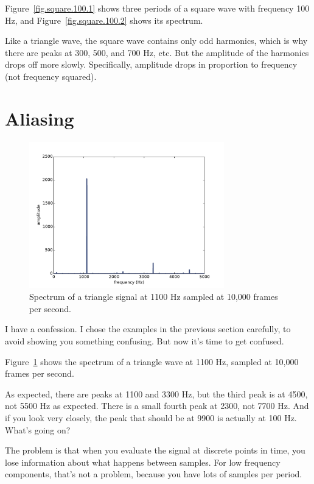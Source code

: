 \documentclass[12pt]{book}
\begin{document}
Figure~\ref{fig.square.100.1} shows three periods of a square
wave with frequency 100 Hz,
and Figure~\ref{fig.square.100.2} shows its spectrum.

Like a triangle wave, the square wave contains only odd harmonics,
which is why there are peaks at 300, 500, and 700 Hz, etc.
But the amplitude of the harmonics drops off more slowly.
Specifically, amplitude drops in proportion to frequency (not frequency
squared).


\section{Aliasing}
\label{aliasing}

\begin{figure}
\centerline{\includegraphics[height=2.5in]{figs/triangle-1100-2.pdf}}
\caption{Spectrum of a triangle signal at 1100 Hz sampled at
10,000 frames per second.}
\label{fig.triangle.1100.2}
\end{figure}

I have a confession.  I chose the examples in the previous section
carefully, to avoid showing you something confusing.  But now it's
time to get confused.

Figure~\ref{fig.triangle.1100.2} shows the spectrum of a triangle wave
at 1100 Hz, sampled at 10,000 frames per second.

As expected, there are peaks at 1100 and 3300 Hz, but the third
peak is at 4500, not 5500 Hz as expected.  There is a small fourth peak
at 2300, not 7700 Hz.  And if you look very closely, the peak that should
be at 9900 is actually at 100 Hz.  What's going on?

The problem is that when you evaluate the signal at
discrete points in time, you lose information about what happens
between samples.  For low frequency components, that's not a
problem, because you have lots of samples per period.
\end{document}
